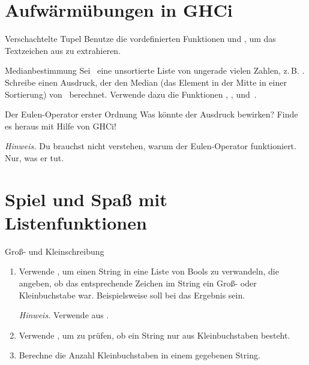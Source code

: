 \documentclass{uebblatt}
\begin{document}


\section{Aufwärmübungen in GHCi}

\begin{aufgabe}{Verschachtelte Tupel}
Benutze die vordefinierten Funktionen  und , um das Textzeichen aus  zu extrahieren.
\end{aufgabe}

\begin{aufgabe}{Medianbestimmung}
Sei~ eine unsortierte Liste von ungerade vielen Zahlen, z.\,B. . Schreibe einen Ausdruck, der den Median (das Element in der Mitte in einer Sortierung) von~ berechnet. Verwende dazu die Funktionen , ,  und~\haskellinline{!!}.
\end{aufgabe}

\begin{aufgabe}{Der Eulen-Operator erster Ordnung}
Was könnte der Ausdruck  bewirken? Finde es heraus mit Hilfe von GHCi!

{\scriptsize \emph{Hinweis.} Du brauchst nicht verstehen, warum der Eulen-Operator funktioniert. Nur, was er tut. \par}
\end{aufgabe}


\section{Spiel und Spaß mit Listenfunktionen}

\begin{aufgabe}{Groß- und Kleinschreibung}
  \begin{enumerate}
    \item Verwende , um einen String in eine Liste von Bools zu verwandeln, die angeben, ob das entsprechende Zeichen im String ein Groß- oder Kleinbuchstabe war.
    Beispielsweise soll bei  das Ergebnis  sein.

    {\scriptsize \emph{Hinweis.} Verwende  aus .\par}
    \item Verwende , um zu prüfen, ob ein
    String nur aus Kleinbuchstaben besteht.
    \item Berechne die Anzahl Kleinbuchstaben in einem gegebenen String.
  \end{enumerate}
\end{aufgabe}
\end{document}
